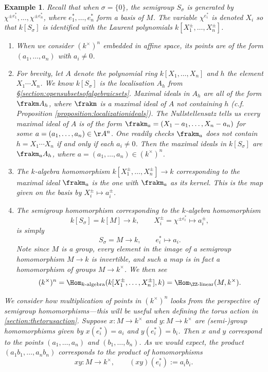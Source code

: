 \documentclass[12pt]{amsart}
\theoremstyle{plain}
\newtheorem{example}[theorem]{Example}
\begin{document}
\begin{example}
Recall that when $\sigma = \{0\}$, the semigroup $S_\sigma$ is generated by $\chi^{\pm e_1^*}, \ldots, \chi^{\pm e_n^*}$, where $e_1^*, \ldots, e_n^*$ form a basis of $M$.
The variable $\chi^{e_i^*}$ is denoted $X_i$ so that $k[S_\sigma]$ is identified with the Laurent polynomials $k[X_1^{\pm}, \ldots, X_n^{\pm}]$.
\begin{enumerate}
\item When we consider $(k^\times)^n$ embedded in affine space, its points are of the form $(a_1, \ldots, a_n)$ with $a_i \ne 0$.
\item For brevity, let $A$ denote the polynomial ring $k[X_1, \ldots, X_n]$ and $h$ the element $X_1 \cdots X_n$.
We know $k[S_\sigma]$ is the localisation $A_h$ from \S\ref{section:opensubsetsofalgebraicsets}.
Maximal ideals in $A_h$ are all of the form $\frakm A_h$, where $\frakm$ is a maximal ideal of $A$ not containing $h$ (c.f. Proposition \ref{proposition:localizationideals}).
The Nullstellensatz tells us every maximal ideal of $A$ is of the form $\frakm_a = (X_1 - a_1, \ldots, X_n - a_n)$ for some $a = (a_1, \ldots, a_n) \in \AA^n$.
One readily checks $\frakm_a$ does not contain $h = X_1 \cdots X_n$ if and only if each $a_i \ne 0$.
Then the maximal ideals in $k[S_\sigma]$ are $\frakm_a A_h$, where $a = (a_1, \ldots, a_n) \in (k^\times)^n$.
\item The $k$-algebra homomorphism $k[X_1^\pm, \ldots, X_n^\pm] \to k$ corresponding to the maximal ideal $\frakm_a$ is the one with $\frakm_a$ as its kernel.
This is the map given on the basis by $X_i^\pm \mapsto a_i^\pm$.
\item The semigroup homomorphism corresponding to the $k$-algebra homomorphism
$$k[S_\sigma]=k[M] \to k, \qquad X_i^\pm = \chi^{\pm e_i^*} \mapsto a_i^\pm,$$
is simply
$$S_\sigma = M \to k, \qquad e_i^* \mapsto a_i.$$
Note since $M$ is a group, every element in the image of a semigroup homomorphism $M \to k$ is invertible, and such a map is in fact a homomorphism of groups $M \to k^\times$.
We then see
$$(k^\times)^n = \Hom_{k\text{-algebra}}(k[X_1^\pm, \ldots, X_n^\pm], k) = \Hom_{\ZZ\text{-linear}}(M, k^\times).$$
\end{enumerate}

We consider how multiplication of points in $(k^\times)^n$ looks from the perspective of semigroup homomorphisms---this will be useful when defining the torus action in \ref{section:thetorusaction}.
Suppose $x : M \to k^\times$ and $y : M \to k^\times$ are (semi-)group homomorphisms given by $x(e_i^*) = a_i$ and $y(e_i^*) = b_i$.
Then $x$ and $y$ correspond to the points $(a_1, \ldots, a_n)$ and $(b_1, \ldots, b_n)$.
As we would expect, the product $(a_1 b_1, \ldots, a_n b_n)$ corresponds to the product of homomorphisms
$$xy : M \to k^\times, \qquad (xy)(e_i^*) := a_i b_i.$$
\end{example}
\end{document}
